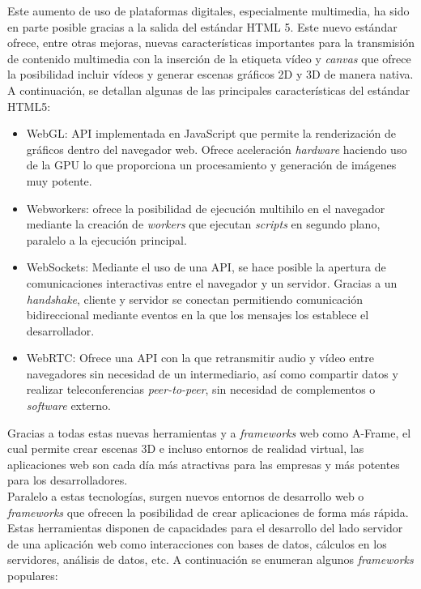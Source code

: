 \documentclass[a4paper, 12pt]{book}
\begin{document}
		Este aumento de uso de plataformas digitales, especialmente multimedia, ha sido en parte posible gracias a la salida del estándar HTML 5. Este nuevo estándar ofrece, entre otras mejoras, nuevas características importantes para la transmisión de contenido multimedia con la inserción de la etiqueta vídeo y \textit{canvas} que ofrece la posibilidad incluir vídeos y generar escenas gráficos 2D y 3D de manera nativa. A continuación, se detallan algunas de las principales características del estándar HTML5:
		
		\begin{itemize}
			\item WebGL: API implementada en JavaScript que permite la renderización de gráficos dentro del navegador web. Ofrece aceleración \textit{hardware} haciendo uso de la GPU lo que proporciona un procesamiento y generación de imágenes muy potente.
			\item Webworkers: ofrece la posibilidad de ejecución multihilo en el navegador mediante la creación de \textit{workers} que ejecutan \textit{scripts} en segundo plano, paralelo a la ejecución principal.
			\item WebSockets: Mediante el uso de una API, se hace posible la apertura de comunicaciones interactivas entre el navegador y un servidor. Gracias a un \textit{handshake}, cliente y servidor se conectan permitiendo comunicación bidireccional mediante eventos en la que los mensajes los establece el desarrollador.
			\item WebRTC: Ofrece una API con la que retransmitir audio y vídeo entre navegadores sin necesidad de un intermediario, así como compartir datos y realizar teleconferencias \textit{peer-to-peer}, sin necesidad de complementos o \textit{software} externo.
		\end{itemize}
			
		Gracias a todas estas nuevas herramientas y a \textit{frameworks} web como A-Frame, el cual permite crear escenas 3D e incluso entornos de realidad virtual, las aplicaciones web son cada día más atractivas para las empresas y más potentes para los desarrolladores. \\
		
		Paralelo a estas tecnologías, surgen nuevos entornos de desarrollo web o \textit{frameworks} que ofrecen la posibilidad de crear aplicaciones de forma más rápida. Estas herramientas disponen de capacidades para el desarrollo del lado servidor de una aplicación web como interacciones con bases de datos, cálculos en los servidores, análisis de datos, etc. A continuación se enumeran algunos \textit{frameworks} populares:
		
\end{document}
